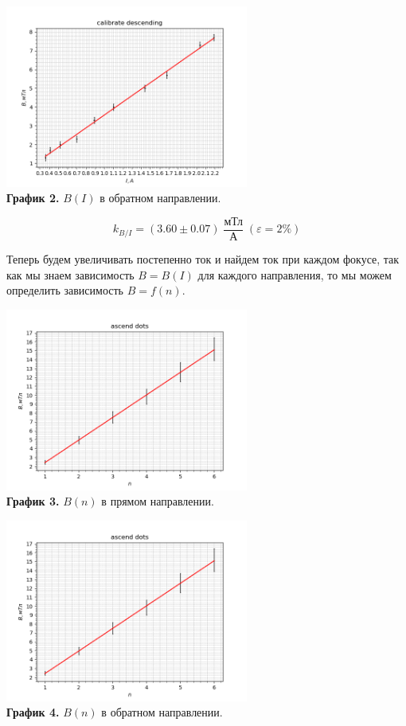 \documentclass[a4paper, 12pt]{article}
\begin{document}
\begin{center}
    \includegraphics[width = 0.6\textwidth]{data/focus/graphs/descend_calibrate.png}\\
    \textbf{График 2.} $B (I)$ в обратном направлении.
\end{center}

\begin{equation}
    k_{B/I} = (3.60 \pm 0.07) \; \frac{\text{мТл}}{\text{А}} \; (\varepsilon = 2 \%)
\end{equation}

Теперь будем увеличивать постепенно ток и найдем ток при каждом фокусе, так как мы знаем зависимость $B = B(I)$ для каждого направления, то мы можем определить зависимость $B = f(n)$.

\begin{center}
    \includegraphics[width = 0.6\textwidth]{data/focus/graphs/ascend_dots.png}\\
    \textbf{График 3.} $B(n)$ в прямом направлении.
\end{center}

\begin{center}
    \includegraphics[width = 0.6\textwidth]{data/focus/graphs/ascend_dots.png}\\
    \textbf{График 4.} $B(n)$ в обратном направлении.
\end{center}
\end{document}
